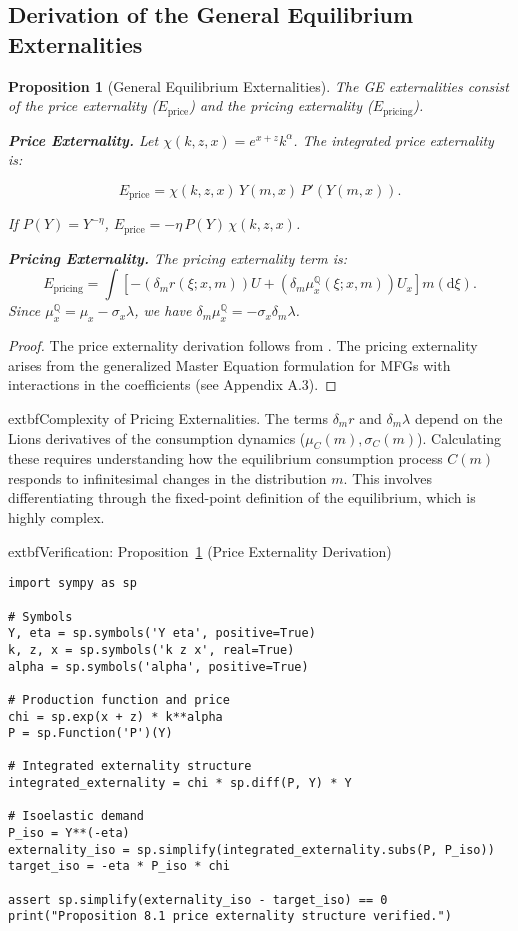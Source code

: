 \documentclass[11pt,letterpaper,oneside]{article}
\newtheorem{propositionT}{Proposition}
\newenvironment{proposition}[2]{\begin{propositionT}[#1]\label{prop:#2}}{\end{propositionT}}
\newcommand{\diff}{\mathrm{d}}
\newcommand{\muxQ}{\mu_x^{\mathbb{Q}}}
\begin{document}
\subsection{Derivation of the General Equilibrium Externalities}

\begin{proposition}{General Equilibrium Externalities}{externality}
The GE externalities consist of the price externality ($E_{\text{price}}$) and the pricing externality ($E_{\text{pricing}}$).

\textbf{Price Externality.} Let $\chi(k,z,x)=e^{x+z}k^\alpha$. The integrated price externality is:

$$
E_{\text{price}} = \chi(k,z,x)\,Y(m,x)\,P'(Y(m,x)).
$$

If $P(Y)=Y^{-\eta}$, $E_{\text{price}} = -\eta\,P(Y)\,\chi(k,z,x)$.

\textbf{Pricing Externality.} The pricing externality term is:
$$
E_{\text{pricing}} = \int \left[ -(\delta_m r(\xi;x,m)) U + (\delta_m \muxQ(\xi;x,m)) U_x \right] m(\diff \xi).
$$
Since $\muxQ = \mu_x - \sigma_x \lambda$, we have $\delta_m \muxQ = -\sigma_x \delta_m \lambda$.
\end{proposition}

\begin{proof}
The price externality derivation follows from . The pricing externality arises from the generalized Master Equation formulation for MFGs with interactions in the coefficients (see Appendix A.3).
\end{proof}

\begin{tcolorbox}[mathstyle]
  extbf{Complexity of Pricing Externalities.} The terms $\delta_m r$ and $\delta_m \lambda$ depend on the Lions derivatives of the consumption dynamics ($\mu_C(m), \sigma_C(m)$). Calculating these requires understanding how the equilibrium consumption process $C(m)$ responds to infinitesimal changes in the distribution $m$. This involves differentiating through the fixed-point definition of the equilibrium, which is highly complex.
\end{tcolorbox}


\begin{tcolorbox}[sympycheckstyle]
  extbf{Verification: Proposition~\ref{prop:externality} (Price Externality Derivation)}
\begin{verbatim}
import sympy as sp

# Symbols
Y, eta = sp.symbols('Y eta', positive=True)
k, z, x = sp.symbols('k z x', real=True)
alpha = sp.symbols('alpha', positive=True)

# Production function and price
chi = sp.exp(x + z) * k**alpha
P = sp.Function('P')(Y)

# Integrated externality structure
integrated_externality = chi * sp.diff(P, Y) * Y

# Isoelastic demand
P_iso = Y**(-eta)
externality_iso = sp.simplify(integrated_externality.subs(P, P_iso))
target_iso = -eta * P_iso * chi

assert sp.simplify(externality_iso - target_iso) == 0
print("Proposition 8.1 price externality structure verified.")
\end{verbatim}
\end{tcolorbox}
\end{document}

